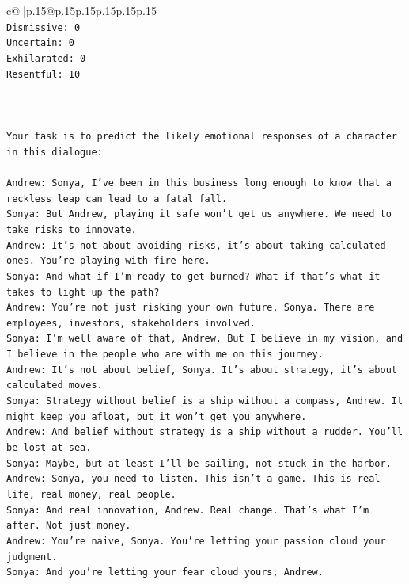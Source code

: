 \documentclass{article}
\begin{document}
{\begin{supertabular}{c@{$\;$}|p{.15\linewidth}@{}p{.15\linewidth}p{.15\linewidth}p{.15\linewidth}p{.15\linewidth}p{.15\linewidth}}
{{{\\ 
\texttt{Dismissive: 0} \\
\texttt{Uncertain: 0} \\
\texttt{Exhilarated: 0} \\
\texttt{Resentful: 10} \\
\\ 
\\ 
\\ 
\texttt{Your task is to predict the likely emotional responses of a character in this dialogue:} \\
\\ 
\texttt{Andrew: Sonya, I've been in this business long enough to know that a reckless leap can lead to a fatal fall.} \\
\texttt{Sonya: But Andrew, playing it safe won't get us anywhere. We need to take risks to innovate.} \\
\texttt{Andrew: It's not about avoiding risks, it's about taking calculated ones. You're playing with fire here.} \\
\texttt{Sonya: And what if I'm ready to get burned? What if that's what it takes to light up the path?} \\
\texttt{Andrew: You're not just risking your own future, Sonya. There are employees, investors, stakeholders involved.} \\
\texttt{Sonya: I'm well aware of that, Andrew. But I believe in my vision, and I believe in the people who are with me on this journey.} \\
\texttt{Andrew: It's not about belief, Sonya. It's about strategy, it's about calculated moves.} \\
\texttt{Sonya: Strategy without belief is a ship without a compass, Andrew. It might keep you afloat, but it won't get you anywhere.} \\
\texttt{Andrew: And belief without strategy is a ship without a rudder. You'll be lost at sea.} \\
\texttt{Sonya: Maybe, but at least I'll be sailing, not stuck in the harbor.} \\
\texttt{Andrew: Sonya, you need to listen. This isn't a game. This is real life, real money, real people.} \\
\texttt{Sonya: And real innovation, Andrew. Real change. That's what I'm after. Not just money.} \\
\texttt{Andrew: You're naive, Sonya. You're letting your passion cloud your judgment.} \\
\texttt{Sonya: And you're letting your fear cloud yours, Andrew.} \\
}}}
\end{supertabular}}
\end{document}
